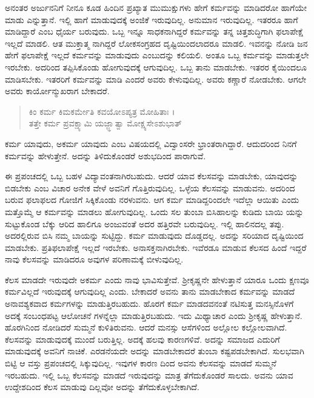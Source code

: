 ಅನಂತರ ಅರ್ಜುನನಿಗೆ ನೀನೂ ಕೂಡ ಹಿಂದಿನ ಪ್ರಖ್ಯಾತ ಮುಮುಕ್ಷುಗಳು ಹೇಗೆ ಕರ್ಮವನ್ನು ಮಾಡಿದರೋ ಹಾಗೆಯೇ ಮಾಡು ಎನ್ನುತ್ತಾನೆ. ಇಲ್ಲಿ ಹಾಗೆ ಮಾಡುವುದಕ್ಕೆ ಅಂಜಿಕೆ ಇರುವುದಿಲ್ಲ. ಅನುಮಾನ ಇರುವುದಿಲ್ಲ. ಇತರರೂ ಹಾಗೆ ಮಾಡಿದ್ದಾರೆ ಎಂಬ ಧೈರ್ಯ ಬರುವುದು. ಒಬ್ಬ ಇನ್ನೂ ಸಾಧಕನಾಗಿದ್ದರೆ ಕರ್ಮವನ್ನು ತನ್ನ ಚಿತ್ತಶುದ್ಧಿಗಾಗಿ ಫಲಾಪೇಕ್ಷೆ ಇಲ್ಲದೆ ಮಾಡಲಿ. ಆತ ಮುಕ್ತಾತ್ಮ ನಾಗಿದ್ದರೆ ಲೋಕಸಂಗ್ರಹದ ದೃಷ್ಟಿಯಿಂದಲಾದರೂ ಮಾಡಲಿ. ಇವನನ್ನು ನೋಡಿ ಜನ ಹೇಗೆ ಫಲಾಪೇಕ್ಷೆ ಇಲ್ಲದೆ ಕರ್ಮವನ್ನು ಮಾಡುವುದು ಎಂಬುದನ್ನು ಕಲಿಯಲಿ. ಅಂತೂ ಒಬ್ಬ ಕರ್ಮವನ್ನು ಮಾಡುತ್ತಲೇ ಇರಬೇಕು. ಅದರಿಂದ ತಪ್ಪಿಸಿಕೊಂಡು ಹೋಗುವುದಕ್ಕೆ ಆಗುವುದಿಲ್ಲ. ಒಬ್ಬ ತಾನು ಮಾಡಬೇಕು. ಇತರರ ಕೈಯಿಂದಲೂ ಮಾಡಿಸಬೇಕು. ಇತರರಿಗೆ ಕರ್ಮವನ್ನು ಮಾಡಿ ಎಂದರೆ ಅವರು ಕೇಳುವುದಿಲ್ಲ. ಅವರು ಕಣ್ಣಾರೆ ನೋಡಬೇಕು. ಆಗಲೇ ಅವರು ಕಾರ್ಯೋನ್ಮುಖರಾಗ ಬೇಕಾದರೆ.

\begin{verse}
ಕಿಂ ಕರ್ಮ ಕಿಮಕರ್ಮೇತಿ ಕವಯೋಽಪ್ಯತ್ರ ಮೋಹಿತಾಃ ।\\ತತ್ತೇ ಕರ್ಮ ಪ್ರವಕ್ಷ್ಯಾಮಿ ಯಜ್ಜ್ಞಾತ್ವಾ ಮೋಕ್ಷ್ಯಸೇಽಶುಭಾತ್ 
\end{verse}

{\small ಕರ್ಮ ಯಾವುದು, ಅಕರ್ಮ ಯಾವುದು ಎಂಬ ವಿಷಯದಲ್ಲಿ ವಿದ್ವಾಂಸರೇ ಭ್ರಾಂತರಾಗಿದ್ದಾರೆ. ಆದುದರಿಂದ ನಿನಗೆ ಕರ್ಮವನ್ನು ಹೇಳುತ್ತೇನೆ. ಅದನ್ನು ತಿಳಿದುಕೊಂಡರೆ ಅಶುಭದಿಂದ ಪಾರಾಗುವೆ.}

ಈ ಪ್ರಪಂಚದಲ್ಲಿ ಒಬ್ಬ ಬಹಳ ವಿದ್ಯಾವಂತನಾಗಿರಬಹುದು. ಆದರೆ ಯಾವ ಕೆಲಸವನ್ನು ಮಾಡಬೇಕು, ಯಾವುದನ್ನು ಬಿಡಬೇಕು ಎಂಬ ವಿಚಾರ ಅನೇಕ ವೇಳೆ ಅವನಿಗೆ ಗೊತ್ತಿರುವುದಿಲ್ಲ. ಒಳ್ಳೆಯ ಕೆಲಸವನ್ನು ಮಾಡುವನು. ಅದರಿಂದ ಬರುವ ಫಲಾಫಲದ ಗೋಜಿಗೆ ಸಿಕ್ಕಿಕೊಂಡು ನರಳುವನು. ಆಗ ಕರ್ಮ ಮಾಡಿದ್ದರಿಂದಲೇ ಇದೆಲ್ಲಾ ಆಯಿತು ಎಂದು ಮತ್ತೊಮ್ಮೆ ಆ ಕರ್ಮವನ್ನು ಮಾಡಲು ಹೋಗುವುದಿಲ್ಲ. ಒಂದು ಸಲ ತುಂಬಾ ಬಿಸಿಹಾಲನ್ನು ಕುಡಿದು ಬಾಯಿ ಯನ್ನು ಸುಟ್ಟುಕೊಂಡ ಬೆಕ್ಕು ಆರಿದ ಹಾಲಿಗೂ ಅಂಜುವಂತೆ ಅದರ ಹತ್ತಿರವೇ ಬರುವುದಿಲ್ಲ. ಇಲ್ಲಿ ಹಾಲಿನದಲ್ಲ ತಪ್ಪು. ಅದರಲ್ಲಿರುವ ಬಿಸಿ ನಮ್ಮ ಬಾಯನ್ನು ಸುಟ್ಟಿದ್ದು. ಕರ್ಮ ಮಾಡುವುದು ದೊಡ್ಡದಲ್ಲ. ಅದನ್ನು ಸರಿಯಾದ ದೃಷ್ಟಿಯಿಂದ ಮಾಡಬೇಕು. ಪ್ರತಿಫಲಾಪೇಕ್ಷೆ ಇಲ್ಲದೆ ಇರಬೇಕು. ಅನಾಸಕ್ತನಾಗಿರಬೇಕು. ಇವೆರಡೂ ಮಾಡುವ ಕೆಲಸದ ಹಿಂದೆ ಇದ್ದರೆ ನಾವು ಕೆಲಸವನ್ನು ಮಾಡಿದರೂ ಅವುಗಳ ಪರಿಣಾಮಕ್ಕೆ ಬೀಳುವುದಿಲ್ಲ.

ಕೆಲಸ ಮಾಡದೇ ಇರುವುದೇ ಅಕರ್ಮ ಎಂದು ನಾವು ಭಾವಿಸುತ್ತೇವೆ. ಶ್ರೀಕೃಷ್ಣನೇ ಹೇಳುತ್ತಾನೆ ಯಾರೂ ಒಂದು ಕ್ಷಣವೂ ಕರ್ಮವಿಲ್ಲದೆ ಇರುವುದಕ್ಕೆ ಆಗುವುದಿಲ್ಲ ಎಂದು. ಬೇಕಾದರೆ ಅವನು ತಾನು ಮಾಡಬೇಕಾದ ಕರ್ಮವನ್ನು ಮಾಡದೆ ಅನಾವಶ್ಯಕವಾದ ಕರ್ಮಗಳನ್ನು ಮಾಡುತ್ತಿರಬಹುದು. ಹೊರಗೆ ಕರ್ಮ ಮಾಡದವನಂತೆ ನಟಿಸುತ್ತ ಮನಸ್ಸಿನೊಳಗೆ ಅದಕ್ಕೆ ಸಂಬಂಧಪಟ್ಟ ಆಲೋಚನೆ ಗಳನ್ನೆಲ್ಲಾ ಮಾಡುತ್ತಿರಬಹುದು. ಇದು ಮಿಥ್ಯಾಚಾರ ಎಂದು ಶ್ರೀಕೃಷ್ಣ ಹೇಳುತ್ತಾನೆ. ಹೊರಗಿನಿಂದ ನೋಡಿದರೆ ಸುಮ್ಮನೆ ಕುಳಿತಿರುವನು. ಆದರೆ ಮನಸ್ಸು ಆಸೆಗಳಿಂದ ಅಲ್ಲೋಲ ಕಲ್ಲೋಲವಾಗಿದೆ. ಕೆಲಸವನ್ನು ಮಾಡುವುದಕ್ಕೆ ಮುಂದೆ ಬರುತ್ತಿಲ್ಲ. ಅದಕ್ಕೆ ಹಲವು ಕಾರಣಗಳಿವೆ. ಅದನ್ನು ಸಮಾಜದ ಎದುರಿಗೆ ಮಾಡುವುದಕ್ಕೆ ಅವನಿಗೆ ನಾಚಿಕೆ. ಎರಡನೆಯದೇ ಅದನ್ನು ಮಾಡಬೇಕಾದರೆ ತುಂಬಾ ಕಷ್ಟಪಡಬೇಕಾಗಿದೆ. ಸುಲಭವಾಗಿ ಬಿಟ್ಟಿ ಆ ವಸ್ತು ಪ್ರಪಂಚದಲ್ಲಿ ಸಿಕ್ಕುವುದಿಲ್ಲ. ಇವುಗಳ ಕಾರಣ ದಿಂದ ಅವನು ಕೆಲಸವನ್ನು ಮಾಡದೆ ಸುಮ್ಮನೆ ಇರಬಹುದು. ಇಲ್ಲಿ ಒಬ್ಬ ಕೆಲಸವನ್ನು ಮಾಡದೆ ಇರುವುದನ್ನು ಮಾತ್ರ ತೆಗೆದುಕೊಂಡರೆ ಸಾಲದು. ಅವನು ಯಾವ ಉದ್ದೇಶದಿಂದ ಕೆಲಸ ಮಾಡುವು ದಿಲ್ಲವೋ ಅದನ್ನು ತೆಗೆದುಕೊಳ್ಳಬೇಕಾಗಿದೆ.

